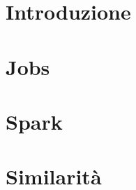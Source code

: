 \providecommand{\main}{.}







{\hypersetup{hidelinks}
	\tableofcontents  %
}

\chapter{Introduzione}


\chapter{Jobs}


\chapter{Spark}


\chapter{Similarità}


%

\appendix
%



